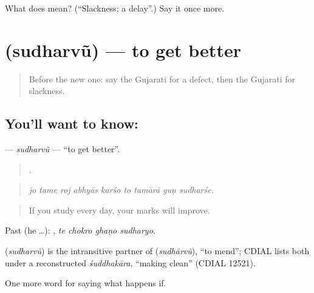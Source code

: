 \begin{tcolorbox}[breakable,colback=teal!4,colframe=teal!35!black,title={Before you move on}]
What does  mean? (\textquotedblleft{}Slackness; a delay\textquotedblright{}.) Say it once more.
\end{tcolorbox}
\section[\texorpdfstring{\gu{સુધરવું} (sudharvũ)}{સુધરવું (sudharvũ)}]{ (sudharvũ) — to get better}

\label{lesson:GU-C376-sudharvu-improve}



\begin{quote}
Before the new one: say the Gujarati for a defect, then the Gujarati for slackness.
\end{quote}

\subsection*{You'll want to know: }
\textbf{} — \emph{sudharvũ} — \textquotedblleft{}to get better\textquotedblright{}.

\begin{quote}
        .
\end{quote}

\begin{quote}
\emph{jo tame roj abhyās karśo to tamārā guṇ sudharśe.}
\end{quote}

\begin{quote}
If you study every day, your marks will improve.
\end{quote}

Past (he …):    , \emph{te chokro ghaṇo sudharyo}.

\begin{cousinweb}
\textbf{} (\emph{sudharvũ}) is the intransitive partner of \textbf{} (\emph{sudhārvũ}), \textquotedblleft{}to mend\textquotedblright{}; CDIAL lists both under a reconstructed \emph{śuddhakāra}, \textquotedblleft{}making clean\textquotedblright{} (CDIAL 12521).
\end{cousinweb}

\begin{grammarlens}[title={What you've built}]
One more word for saying what happens if.
\end{grammarlens}


